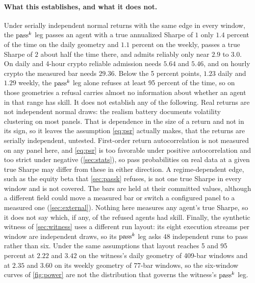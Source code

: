 \paragraph{What this establishes, and what it does not.} Under serially independent normal returns with the same edge in every window, the $\text{pass}^{k}$ leg passes an agent with a true annualized Sharpe of $1$ only $1.4$ percent of the time on the daily geometry and $1.1$ percent on the weekly, passes a true Sharpe of $2$ about half the time there, and admits reliably only near $2.9$ to $3.0$. On daily and 4-hour crypto reliable admission needs $5.64$ and $5.46$, and on hourly crypto the measured bar needs $29.36$. Below the 5 percent points, $1.23$ daily and $1.29$ weekly, the $\text{pass}^{k}$ leg alone refuses at least 95 percent of the time, so on those geometries a refusal carries almost no information about whether an agent in that range has skill. It does not establish any of the following. Real returns are not independent normal draws: the realism battery documents volatility clustering on most panels. That is dependence in the size of a return and not in its sign, so it leaves the assumption \cref{eq:psr} actually makes, that the returns are serially independent, untested. First-order return autocorrelation is not measured on any panel here, and \cref{eq:psr} is too favorable under positive autocorrelation and too strict under negative (\cref{sec:stats}), so pass probabilities on real data at a given true Sharpe may differ from these in either direction. A regime-dependent edge, such as the equity beta that \cref{sec:passk} refuses, is not one true Sharpe in every window and is not covered. The bars are held at their committed values, although a different field could move a measured bar or switch a configured panel to a measured one (\cref{sec:external}). Nothing here measures any agent's true Sharpe, so it does not say which, if any, of the refused agents had skill. Finally, the synthetic witness of \cref{sec:witness} uses a different run layout: its eight execution streams per window are independent draws, so its $\text{pass}^{k}$ leg asks 48 independent runs to pass rather than six. Under the same assumptions that layout reaches 5 and 95 percent at $2.22$ and $3.42$ on the witness's daily geometry of 409-bar windows and at $2.35$ and $3.60$ on its weekly geometry of 77-bar windows, so the six-window curves of \cref{fig:power} are not the distribution that governs the witness's $\text{pass}^{k}$ leg.

